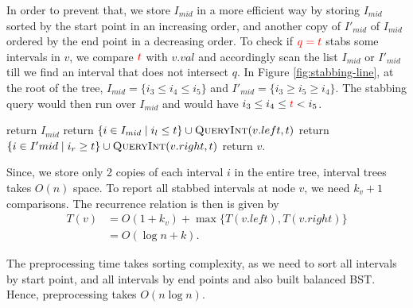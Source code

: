 In order to prevent that, we store $I_{mid}$ in a more efficient way by storing $I_{mid}$ sorted by the start point in an increasing order, and another copy of $I'_{mid}$ of $I_{mid}$ ordered by the end point in a decreasing order.
%
To check if $\textcolor{red}{q = t}$ stabs some intervals in $v$, we compare $\textcolor{red}{t} $ with $v.val$ and accordingly scan the list $I_{mid}$ or $I'_{mid}$ till we find an interval that does not intersect $q$.
%  
In Figure \ref{fig:stabbing-line}, at the root of the tree, $I_{mid} = \{ i_3 \leq  i_4 \leq i_5 \} $ and $I'_{mid} = \{ i_3 \geq  i_5 \geq i_4 \}$. 
%
The stabbing query would then run over $I_{mid}$ and would have $i_3 \leq i_4 \leq \textcolor{red}{t} < i_5$.  

\begin{algorithm}[H]
    \caption{} 
    \label{alg:build-interval}
    \begin{algorithmic}[1]
        		return $I_{mid}$
        	\EndIf
        		\State return $ \{ i \in I_{mid} \mid i_l \leq t \}  \cup \textsc{QueryInt}(v.left, t)$
       		\Else 
       			\State return $\{ i \in I'{mid} \mid  i_r \geq t\} \cup \textsc{QueryInt}(v.right, t)$
        	\EndIf
          \State return $v$.
        \EndFunction
    \end{algorithmic}
\end{algorithm}

Since, we store only 2 copies of each interval $i$ in the entire tree, interval trees takes $O(n)$ space. To report all stabbed intervals at node $v$, we need $k_v +1 $ comparisons. The recurrence relation is then is given by
\begin{align*} 
T(v) &= O(1 + k_v) + \max \{T(v.left) , T(v.right) \}   \\
& = O(\log n + k).
\end{align*}

The preprocessing time takes sorting complexity, as we need to sort all intervals by start point, and all intervals by end points and also built balanced BST. Hence, preprocessing takes $O(n\log n)$.